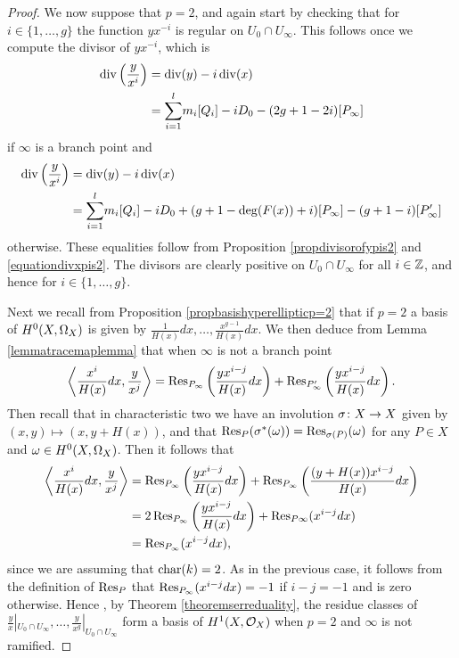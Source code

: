 \begin{proof}
    We now suppose that $p=2$, and again start by checking that for $i \in \{1, \ldots , g\}$ the function $yx^{-i}$ is regular on $U_0 \cap U_\infty$.
    This follows once we compute the divisor of $yx^{-i}$, which is
        \begin{align*}
        \operatorname{div} \left( \frac{y}{x^i} \right)  & =  \operatorname{div}(y) - i\operatorname{div}(x) \\
        & = {\displaystyle \sum_{i=1}^l} m_i[Q_i] -iD_0 -(2g+1 - 2i)[P_\infty]
        \end{align*}
    if $\infty$ is a branch point and
        \begin{align*}
        \operatorname{div} \left( \frac{y}{x^i} \right)  & =  \operatorname{div}(y) - i\operatorname{div}(x) \\  
        & = {\displaystyle \sum_{i=1}^l} m_i[Q_i] - iD_0 +(g+1-\deg(F(x)) + i)[P_\infty] - (g+1-i)[P_\infty']
        \end{align*}
    otherwise.
    These equalities follow from Proposition \ref{propdivisorofypis2} and \eqref{equationdivxpis2}.
    The divisors are clearly positive on $U_0 \cap U_\infty$ for all $i \in {\mathbb Z}$, and hence for $ i \in \{1, \ldots, g \}$.
    
    Next we recall from Proposition \ref{propbasishyperellipticp=2}  that if $p=2$ a basis of ${H^0(X,\Omega_X)}$ is given by $\frac{1}{H(x)}dx, \ldots, \frac{x^{g-1}}{H(x)}dx$.
    We then deduce from Lemma \ref{lemmatracemaplemma} that when $\infty$ is not a branch point
        \[
        \left \langle \frac{x^i}{H(x)}dx, \frac{y}{x^j} \right \rangle = \operatorname{Res}_{P_\infty} \left( \frac{yx^{i-j}}{H(x)}dx \right) + \operatorname{Res}_{P_\infty'}\left( \frac{yx^{i-j}}{H(x)} dx \right).
        \]
    Then recall that in characteristic two we have an involution $\sigma \colon X \rightarrow X$ given by $(x,y) \mapsto (x, y + H(x))$, and that $\operatorname{Res}_P(\sigma^*(\omega)) = \operatorname{Res}_{\sigma(P)}(\omega)$ for any $P \in X$ and $\omega\in {H^0(X,\Omega_X)}$.
    Then it follows that
        \begin{align*}
        \left \langle \frac{x^i}{H(x)}dx, \frac{y}{x^j} \right \rangle & = \operatorname{Res}_{P_ \infty} \left( \frac{yx^{i-j}}{H(x)}dx \right) + \operatorname{Res}_{P_ \infty} \left( \frac{(y+H(x))x^{i-j}}{H(x)}dx \right) \\
        & = 2\operatorname{Res}_{P_\infty}\left( \frac{yx^{i-j}}{H(x)}dx \right) + \operatorname{Res}_{P \infty}(x^{i-j}dx) \\
        & = \operatorname{Res}_{P_\infty}(x^{i-j}dx),
        \end{align*}
    since we are assuming that $\operatorname{char}(k) = 2$.
    As in the previous case, it follows from the definition of $\operatorname{Res}_P$ that $\operatorname{Res}_{P_\infty}(x^{i-j}dx) = -1$ if $i-j = -1$ and is zero otherwise.
    Hence , by Theorem \ref{theoremserreduality}, the residue classes of $\frac{y}{x}|_{U_0 \cap U_\infty}, \ldots, \frac{y}{x^g}|_{U_0 \cap U_\infty}$ form a basis of $H^1(X,\mathcal{O}_X)$ when $p = 2$ and $\infty$ is not ramified.
    

\end{proof}
